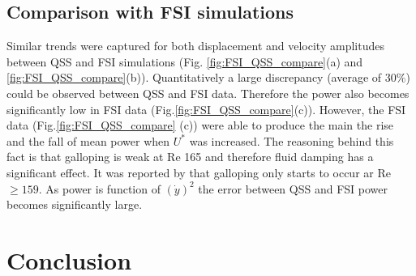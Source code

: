\subsection{Comparison with FSI simulations}
 Similar trends were captured for both displacement and velocity amplitudes between QSS and FSI simulations (Fig. \ref{fig:FSI_QSS_compare}(a) and \ref{fig:FSI_QSS_compare}(b)). Quantitatively a large discrepancy (average of $30\%$) could be observed between QSS and FSI data. Therefore the power also becomes significantly low in FSI data (Fig.\ref{fig:FSI_QSS_compare}(c)). However, the FSI data (Fig.\ref{fig:FSI_QSS_compare} (c)) were able to produce the main the rise and the fall of mean power when $U^*$ was increased. The reasoning behind this fact is that galloping is weak at Re 165  and therefore fluid damping has a significant effect. It was reported by \cite{Barrero-Gil2009} that galloping only starts to occur ar Re $\geq 159$. As power is function of $(\dot{y})^2$ the error between QSS and FSI power becomes significantly large.  
 

 

\section{Conclusion}








 

 
 
 

 
 



 
 
 
 
 
 
 
 
 
 
  
 
 
